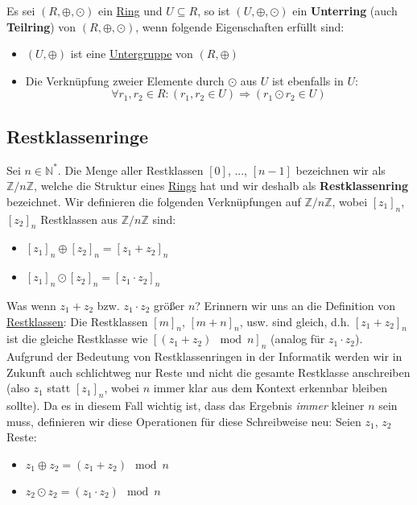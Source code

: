 \documentclass[../../main.tex]{subfiles}
\begin{document}
		\begin{definition}
			\label{def:Unterring}
			Es sei $(R,\oplus,\odot)$ ein \hyperref[def:Ring]{Ring} und $U \subseteq R$, so ist $(U,\oplus,\odot)$ ein \textbf{Unterring} (auch \textbf{Teilring}) von $(R,\oplus,\odot)$, wenn folgende Eigenschaften erfüllt sind:  
			\begin{itemize}
				\item $(U,\oplus)$ ist eine \hyperref[def:Untergruppe]{Untergruppe} von $(R,\oplus)$
				\item Die Verknüpfung zweier Elemente durch $\odot$ aus $U$ ist ebenfalls in $U$: $$\forall r_1,r_2 \in R: (r_1, r_2 \in U) \Rightarrow (r_1 \odot r_2 \in U)$$
			\end{itemize}
		\end{definition}
	
		\subsection*{Restklassenringe}
		\begin{definition}[Restklassenring]
			\label{def:Restklassenring}
			Sei $n \in \mathbb{N}^*$. Die Menge aller Restklassen $[0]$, ..., $[n-1]$ bezeichnen wir als $\mathbb{Z}/n\mathbb{Z}$, welche die Struktur eines \hyperref[def:Ring]{Rings} hat und wir deshalb als \textbf{Restklassenring} bezeichnet. Wir definieren die folgenden Verknüpfungen auf $\mathbb{Z}/n\mathbb{Z}$, wobei $[z_1]_n$, $[z_2]_n$ Restklassen aus $\mathbb{Z}/n\mathbb{Z}$ sind: 
			\begin{itemize}
				\item $[z_1]_n \oplus [z_2]_n = [z_1 + z_2]_n$
				\item $[z_1]_n \odot [z_2]_n = [z_1 \cdot z_2]_n$
			\end{itemize}
			Was wenn $z_1+z_2$ bzw. $z_1 \cdot z_2$ größer $n$? Erinnern wir uns an die Definition von \hyperref[def:Restklasse]{Restklassen}: Die Restklassen $[m]_n$, $[m+n]_n$, usw. sind gleich, d.h. $[z_1 + z_2]_n$ ist die gleiche Restklasse wie $[(z_1 + z_2) \mod n]_n$ (analog für $z_1 \cdot z_2$). \\
			
			Aufgrund der Bedeutung von Restklassenringen in der Informatik werden wir in Zukunft auch schlichtweg nur Reste und nicht die gesamte Restklasse anschreiben (also $z_1$ statt $[z_1]_n$, wobei $n$ immer klar aus dem Kontext erkennbar bleiben sollte). Da es in diesem Fall wichtig ist, dass das Ergebnis \textit{immer} kleiner $n$ sein muss, definieren wir diese Operationen für diese Schreibweise neu: Seien $z_1$, $z_2$ Reste:
			\begin{itemize}
				\item $z_1 \oplus z_2 = (z_1 + z_2) \mod n$
				\item $z_2 \odot z_2 = (z_1 \cdot z_2) \mod n$
			\end{itemize}
		\end{definition}
		
\end{document}
